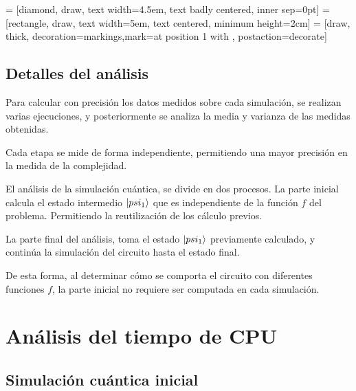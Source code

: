 %
\begin{center}
 = [diamond, draw, text width=4.5em, text badly centered, 
inner sep=0pt]
 = [rectangle, draw, text width=5em, text centered, minimum 
height=2cm]
 = [draw, thick, decoration={markings,mark=at position 
1 with {}}, postaction={decorate}]
%
\end{center}
%

\subsection{Detalles del análisis}
Para calcular con precisión los datos medidos sobre cada simulación, se realizan 
varias ejecuciones, y posteriormente se analiza la media y varianza de las 
medidas obtenidas.

Cada etapa se mide de forma independiente, permitiendo una mayor precisión en la 
medida de la complejidad.

El análisis de la simulación cuántica, se divide en dos procesos. La parte 
inicial calcula el estado intermedio $\ket{psi_1}$ que es independiente de la 
función $f$ del problema. Permitiendo la reutilización de los cálculo previos.

La parte final del análisis, toma el estado $\ket{psi_1}$ previamente calculado, 
y continúa la simulación del circuito hasta el estado final.

De esta forma, al determinar cómo se comporta el circuito con diferentes 
funciones $f$, la parte inicial no requiere ser computada en cada simulación.


\section{Análisis del tiempo de CPU}
\subsection{Simulación cuántica inicial}



